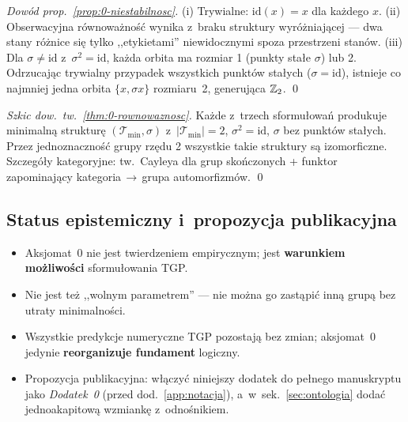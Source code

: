 \begin{proof}[Dow\'od prop.~\ref{prop:0-niestabilnosc}]
(i) Trywialne: $\mathrm{id}(x) = x$ dla ka\.zdego $x$. (ii)
Obserwacyjna r\'ownowa\.zno\'s\'c wynika z~braku struktury wyr\'o\.zniaj\k{a}cej
--- dwa stany r\'o\.znice si\k{e} tylko ,,etykietami'' niewidocznymi
spoza przestrzeni stan\'ow. (iii) Dla $\sigma \neq \mathrm{id}$
z~$\sigma^2 = \mathrm{id}$, ka\.zda orbita ma rozmiar 1 (punkty
sta\l{}e $\sigma$) lub 2. Odrzucaj\k{a}c trywialny przypadek wszystkich
punkt\'ow sta\l{}ych ($\sigma = \mathrm{id}$), istnieje co najmniej
jedna orbita $\{x, \sigma x\}$ rozmiaru~2, generuj\k{a}ca $\mathbb{Z}_2$. \qed
\end{proof}

\begin{proof}[Szkic dow.~tw.~\ref{thm:0-rownowaznosc}]
Ka\.zde z~trzech sformu\l{}owa\'n produkuje minimaln\k{a} struktur\k{e}
$(\mathcal{T}_{\min}, \sigma)$ z~$|\mathcal{T}_{\min}| = 2$,
$\sigma^2 = \mathrm{id}$, $\sigma$ bez punkt\'ow sta\l{}ych.
Przez jednoznaczno\'s\'c grupy rz\k{e}du 2 wszystkie takie struktury
s\k{a} izomorficzne. Szczeg\'o\l{}y kategoryjne: tw.~Cayleya dla
grup sko\'nczonych + funktor zapominaj\k{a}cy kategoria\,$\to$\,grupa
automorfizm\'ow. \qed
\end{proof}

\subsection{Status epistemiczny i~propozycja publikacyjna}%
\label{app:0-status}

\begin{itemize}[nosep]
  \item Aksjomat~0 nie jest twierdzeniem empirycznym; jest
    \textbf{warunkiem mo\.zliwo\'sci} sformu\l{}owania TGP.
  \item Nie jest te\.z ,,wolnym parametrem'' --- nie mo\.zna go
    zast\k{a}pi\'c inn\k{a} grup\k{a} bez utraty minimalno\'sci.
  \item Wszystkie predykcje numeryczne TGP pozostaj\k{a} bez zmian;
    aksjomat~0 jedynie \textbf{reorganizuje fundament} logiczny.
  \item Propozycja publikacyjna: w\l{}\k{a}czy\'c niniejszy dodatek
    do pe\l{}nego manuskryptu jako \emph{Dodatek~0} (przed
    dod.~\ref{app:notacja}), a~w~sek.~\ref{sec:ontologia} doda\'c
    jednoakapitow\k{a} wzmiank\k{e} z~odnośnikiem.
\end{itemize}

